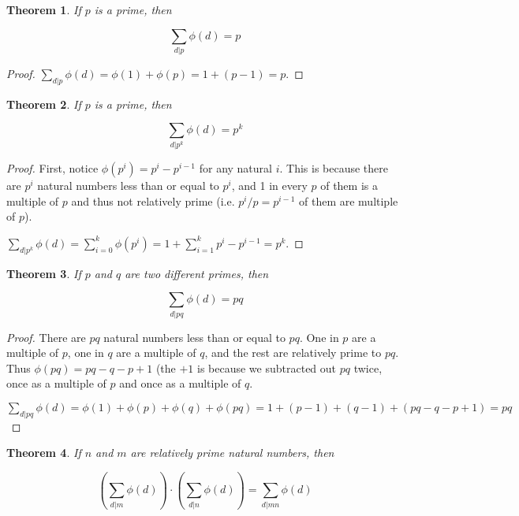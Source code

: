 \documentclass{article}
\newtheorem{thm}{Theorem}[section]
\numberwithin{equation}{thm}
\begin{document}
\begin{thm} \label{6.11}
  If $p$ is a prime, then

  $$\sum_{d|p} \phi(d) = p$$
\end{thm}

\begin{proof}
  $\sum_{d|p} \phi(d) = \phi(1) + \phi(p) = 1 + (p-1) = p$.
\end{proof}



\begin{thm} \label{6.12}
  If $p$ is a prime, then

  $$\sum_{d|p^k} \phi(d) = p^k$$
\end{thm}

\begin{proof}
  First, notice $\phi(p^i) = p^i - p^{i-1}$ for any natural $i$. This is because there are $p^i$ natural numbers less than or equal to $p^i$, and 1 in every $p$ of them is a multiple of $p$ and thus not relatively prime (i.e. $p^{i} / p = p^{i-1}$ of them are multiple of $p$).

  $\sum_{d|p^k} \phi(d) = \sum_{i=0}^k \phi(p^i) = 1 + \sum_{i=1}^k p^i - p^{i-1} = p^k$.
\end{proof}



\begin{thm} \label{6.13}
  If $p$ and $q$ are two different primes, then

  $$\sum_{d|pq} \phi(d) = pq$$
\end{thm}

\begin{proof}
  There are $pq$ natural numbers less than or equal to $pq$. One in $p$ are a multiple of $p$, one in $q$ are a multiple of $q$, and the rest are relatively prime to $pq$. Thus $\phi(pq) = pq - q - p + 1$ (the $+1$ is because we subtracted out $pq$ twice, once as a multiple of $p$ and once as a multiple of $q$.

  $\sum_{d|pq} \phi(d) = \phi(1) + \phi(p) + \phi(q) + \phi(pq) = 1 + (p-1) + (q-1) + (pq - q - p + 1) = pq$
\end{proof}



\begin{thm} \label{6.14}
  If $n$ and $m$ are relatively prime natural numbers, then

  $$\left( \sum_{d|m} \phi(d) \right) \cdot \left( \sum_{d|n} \phi(d) \right) = \sum_{d|mn} \phi(d)$$
\end{thm}
\end{document}
